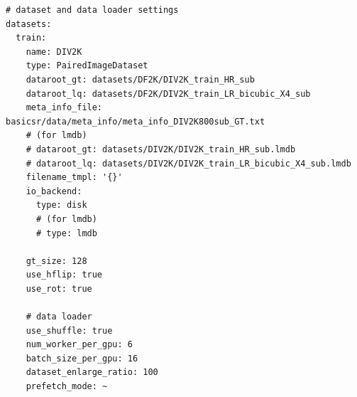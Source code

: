 \documentclass[../main.tex]{subfiles}
\begin{document}
\begin{verbatim}
# dataset and data loader settings
datasets:
  train:
    name: DIV2K
    type: PairedImageDataset
    dataroot_gt: datasets/DF2K/DIV2K_train_HR_sub
    dataroot_lq: datasets/DF2K/DIV2K_train_LR_bicubic_X4_sub
    meta_info_file: basicsr/data/meta_info/meta_info_DIV2K800sub_GT.txt
    # (for lmdb)
    # dataroot_gt: datasets/DIV2K/DIV2K_train_HR_sub.lmdb
    # dataroot_lq: datasets/DIV2K/DIV2K_train_LR_bicubic_X4_sub.lmdb
    filename_tmpl: '{}'
    io_backend:
      type: disk
      # (for lmdb)
      # type: lmdb

    gt_size: 128
    use_hflip: true
    use_rot: true

    # data loader
    use_shuffle: true
    num_worker_per_gpu: 6
    batch_size_per_gpu: 16
    dataset_enlarge_ratio: 100
    prefetch_mode: ~
\end{verbatim}
\end{document}
